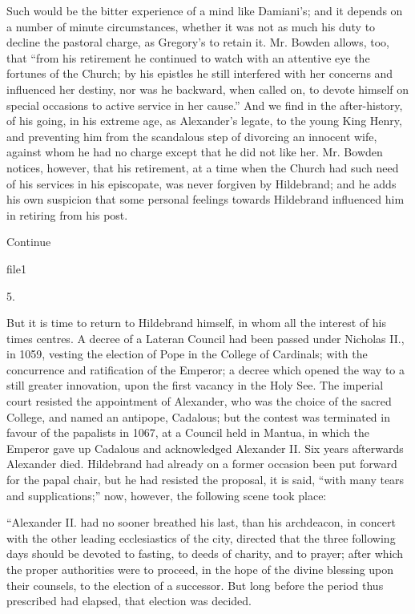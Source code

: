 Such would be the bitter experience of a mind
like Damiani's; and it depends on a number of minute circumstances,
whether it was not as much his duty to decline the pastoral charge, as
Gregory's to retain it. Mr. Bowden allows, too, that ``from his
retirement he continued to watch with an attentive eye the fortunes of
the Church; by his epistles he still interfered with her concerns and
influenced her destiny, nor was he backward, when called on, to devote
himself on special occasions to active service in her cause.'' And we
find in the after-history, of his going, in his extreme age, as
Alexander's legate, to the young King Henry, and preventing him from
the scandalous step of divorcing an innocent wife, against whom he had
no charge except that he did not like her. Mr. Bowden notices,
however, that his retirement, at a time when the Church had such need
of his services in his episcopate, was never forgiven by Hildebrand;
and he adds his own suspicion that some personal feelings towards
Hildebrand influenced him in retiring from his post.

Continue


file1

5.

But it is time to return to Hildebrand himself,
in whom all the interest of his times centres. A decree of a Lateran
Council had been passed under Nicholas II., in 1059, vesting the
election of Pope in the College of Cardinals; with the concurrence and
ratification of the Emperor; a decree which opened the way to a still
greater innovation, upon the first vacancy in the Holy See. The
imperial court resisted the appointment of Alexander, who was the
choice of the sacred College, and named an antipope, Cadalous;
but the contest was terminated in favour of the papalists in 1067, at
a Council held in Mantua, in which the Emperor gave up Cadalous and
acknowledged Alexander II. Six years afterwards Alexander died.
Hildebrand had already on a former occasion been put forward for the
papal chair, but he had resisted the proposal, it is said, ``with many
tears and supplications;'' now, however, the following scene took
place:

``Alexander
II. had no sooner breathed his last, than his archdeacon, in concert
with the other leading ecclesiastics of the city, directed that the
three following days should be devoted to fasting, to deeds of
charity, and to prayer; after which the proper authorities were to
proceed, in the hope of the divine blessing upon their counsels, to
the election of a successor. But long before the period thus
prescribed had elapsed, that election was decided.

